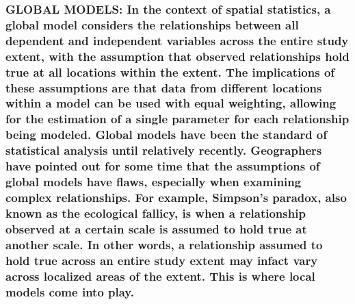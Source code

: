\documentclass[
  12pt,
]{article}
\begin{document}
\hypertarget{global-models-in-the-context-of-spatial-statistics-a-global-model-considers-the-relationships-between-all-dependent-and-independent-variables-across-the-entire-study-extent-with-the-assumption-that-observed-relationships-hold-true-at-all-locations-within-the-extent.-the-implications-of-these-assumptions-are-that-data-from-different-locations-within-a-model-can-be-used-with-equal-weighting-allowing-for-the-estimation-of-a-single-parameter-for-each-relationship-being-modeled.-global-models-have-been-the-standard-of-statistical-analysis-until-relatively-recently.-geographers-have-pointed-out-for-some-time-that-the-assumptions-of-global-models-have-flaws-especially-when-examining-complex-relationships.-for-example-simpsons-paradox-also-known-as-the-ecological-fallicy-is-when-a-relationship-observed-at-a-certain-scale-is-assumed-to-hold-true-at-another-scale.-in-other-words-a-relationship-assumed-to-hold-true-across-an-entire-study-extent-may-infact-vary-across-localized-areas-of-the-extent.-this-is-where-local-models-come-into-play.}{%
\subsubsection{GLOBAL MODELS: In the context of spatial statistics, a
global model considers the relationships between all dependent and
independent variables across the entire study extent, with the
assumption that observed relationships hold true at all locations within
the extent. The implications of these assumptions are that data from
different locations within a model can be used with equal weighting,
allowing for the estimation of a single parameter for each relationship
being modeled. Global models have been the standard of statistical
analysis until relatively recently. Geographers have pointed out for
some time that the assumptions of global models have flaws, especially
when examining complex relationships. For example, Simpson's paradox,
also known as the ecological fallicy, is when a relationship observed at
a certain scale is assumed to hold true at another scale. In other
words, a relationship assumed to hold true across an entire study extent
may infact vary across localized areas of the extent. This is where
local models come into
play.}\label{global-models-in-the-context-of-spatial-statistics-a-global-model-considers-the-relationships-between-all-dependent-and-independent-variables-across-the-entire-study-extent-with-the-assumption-that-observed-relationships-hold-true-at-all-locations-within-the-extent.-the-implications-of-these-assumptions-are-that-data-from-different-locations-within-a-model-can-be-used-with-equal-weighting-allowing-for-the-estimation-of-a-single-parameter-for-each-relationship-being-modeled.-global-models-have-been-the-standard-of-statistical-analysis-until-relatively-recently.-geographers-have-pointed-out-for-some-time-that-the-assumptions-of-global-models-have-flaws-especially-when-examining-complex-relationships.-for-example-simpsons-paradox-also-known-as-the-ecological-fallicy-is-when-a-relationship-observed-at-a-certain-scale-is-assumed-to-hold-true-at-another-scale.-in-other-words-a-relationship-assumed-to-hold-true-across-an-entire-study-extent-may-infact-vary-across-localized-areas-of-the-extent.-this-is-where-local-models-come-into-play.}}
\end{document}
